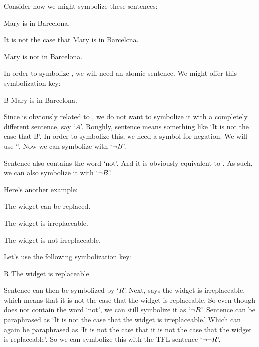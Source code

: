 Consider how we might symbolize these sentences:

	\begin{earg}
	\item[\ex{not1}] Mary is in Barcelona.
	\item[\ex{not2}] It is not the case that Mary is in Barcelona.
	\item[\ex{not3}] Mary is not in Barcelona.
	\end{earg}
	
In order to symbolize , we will need an atomic sentence. We might offer this symbolization key:

	\begin{ekey}
		\item[B] Mary is in Barcelona.
	\end{ekey}
	
Since  is obviously related to , we do not want to symbolize it with a completely different sentence, say `$A$'. Roughly, sentence  means something like `It is not the case that B'. In order to symbolize this, we need a symbol for negation. We will use `\enot'. Now we can symbolize  with `$\neg B$'.

Sentence  also contains the word `not'. And it is obviously equivalent to . As such, we can also symbolize it with `$\neg B$'.

Here's another example:

	\begin{earg}
		\item[\ex{not4}] The widget can be replaced.
		\item[\ex{not5}] The widget is irreplaceable.
		\item[\ex{not5b}] The widget is not irreplaceable.
	\end{earg}
	
Let's use the following symbolization key:

	\begin{ekey}
		\item[R] The widget is replaceable
	\end{ekey}
	
Sentence  can then be symbolized by `$R$'. Next,  says the widget is irreplaceable, which means that it is not the case that the widget is replaceable. So even though  does not contain the word `not', we can still symbolize it as `$\neg R$'.  Sentence  can be paraphrased as `It is not the case that the widget is irreplaceable.' Which can again be paraphrased as `It is not the case that it is not the case that the widget is replaceable'. So we can symbolize this with the TFL sentence `$\neg\neg R$'.

